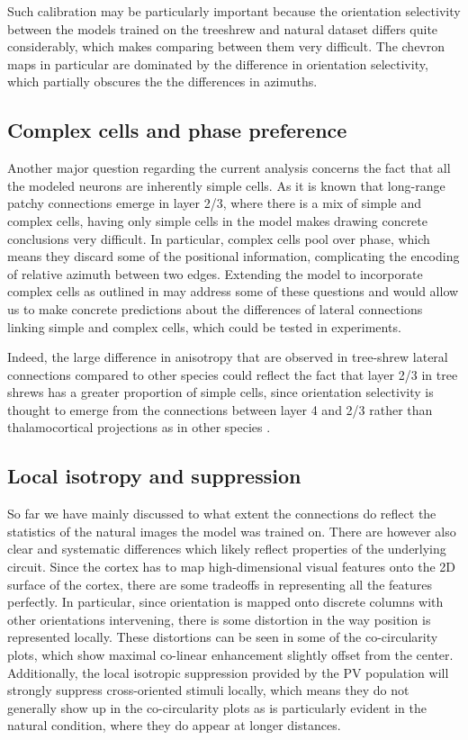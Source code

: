 Such calibration may be particularly important because the orientation
selectivity between the models trained on the treeshrew and natural
dataset differs quite considerably, which makes comparing between them
very difficult. The chevron maps in particular are dominated by the
difference in orientation selectivity, which partially obscures the
the differences in azimuths.

\subsection{Complex cells and phase preference}

Another major question regarding the current analysis concerns the
fact that all the modeled neurons are inherently simple cells. As it
is known that long-range patchy connections emerge in layer 2/3, where
there is a mix of simple and complex cells, having only simple cells
in the model makes drawing concrete conclusions very difficult. In
particular, complex cells pool over phase, which means they discard
some of the positional information, complicating the encoding of
relative azimuth between two edges. Extending the model to incorporate
complex cells as outlined in \cite{Antolik2010} may address some of
these questions and would allow us to make concrete predictions about
the differences of lateral connections linking simple and complex
cells, which could be tested in experiments.

Indeed, the large difference in anisotropy that are observed in
tree-shrew lateral connections compared to other species could reflect
the fact that layer 2/3 in tree shrews has a greater proportion of
simple cells, since orientation selectivity is thought to emerge from
the connections between layer 4 and 2/3 rather than thalamocortical
projections as in other species \citep{VanHooser2013}.

\subsection{Local isotropy and suppression}

So far we have mainly discussed to what extent the connections do
reflect the statistics of the natural images the model was trained
on. There are however also clear and systematic differences which
likely reflect properties of the underlying circuit. Since the cortex
has to map high-dimensional visual features onto the 2D surface of the
cortex, there are some tradeoffs in representing all the features
perfectly. In particular, since orientation is mapped onto discrete
columns with other orientations intervening, there is some distortion
in the way position is represented locally.  These distortions can be
seen in some of the co-circularity plots, which show maximal co-linear
enhancement slightly offset from the center. Additionally, the local
isotropic suppression provided by the PV population will strongly
suppress cross-oriented stimuli locally, which means they do not
generally show up in the co-circularity plots as is particularly
evident in the natural condition, where they do appear at longer
distances.

